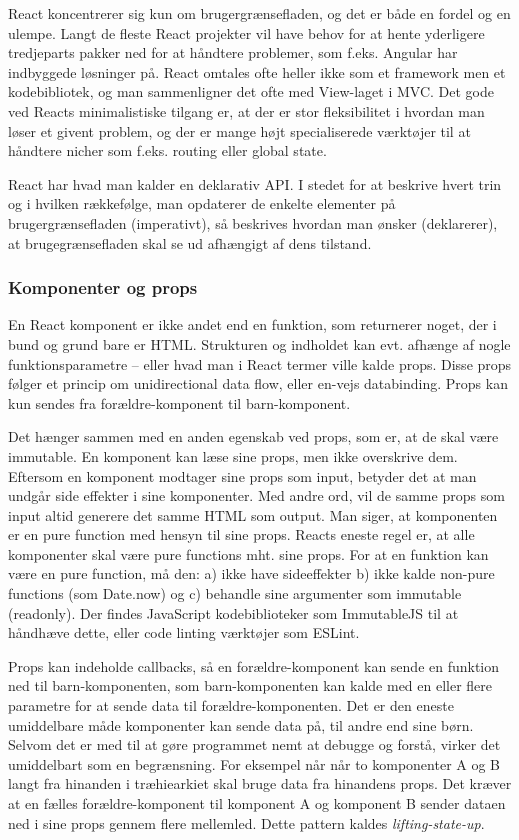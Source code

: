 \documentclass[]{article}
\begin{document}
React koncentrerer sig kun om brugergrænsefladen, og det er både en
fordel og en ulempe. Langt de fleste React projekter vil have behov for
at hente yderligere tredjeparts pakker ned for at håndtere problemer,
som f.eks. Angular har indbyggede løsninger på. React omtales ofte
heller ikke som et framework men et kodebibliotek, og man sammenligner
det ofte med View-laget i MVC. Det gode ved Reacts minimalistiske
tilgang er, at der er stor fleksibilitet i hvordan man løser et givent
problem, og der er mange højt specialiserede værktøjer til at håndtere
nicher som f.eks. routing eller global state.

React har hvad man kalder en deklarativ API. I stedet for at beskrive
hvert trin og i hvilken rækkefølge, man opdaterer de enkelte elementer
på brugergrænsefladen (imperativt), så beskrives hvordan man ønsker
(deklarerer), at brugegrænsefladen skal se ud afhængigt af dens
tilstand.

\hypertarget{komponenter-og-props}{%
\subsubsection{Komponenter og props}\label{komponenter-og-props}}

En React komponent er ikke andet end en funktion, som returnerer noget,
der i bund og grund bare er HTML. Strukturen og indholdet kan evt.
afhænge af nogle funktionsparametre -- eller hvad man i React termer
ville kalde props. Disse props følger et princip om unidirectional data
flow, eller en-vejs databinding. Props kan kun sendes fra
forældre-komponent til barn-komponent.

Det hænger sammen med en anden egenskab ved props, som er, at de skal
være immutable. En komponent kan læse sine props, men ikke overskrive
dem. Eftersom en komponent modtager sine props som input, betyder det at
man undgår side effekter i sine komponenter. Med andre ord, vil de samme
props som input altid generere det samme HTML som output. Man siger, at
komponenten er en pure function med hensyn til sine props. Reacts eneste
regel er, at alle komponenter skal være pure functions mht. sine props.
For at en funktion kan være en pure function, må den: a) ikke have
sideeffekter b) ikke kalde non-pure functions (som Date.now) og c)
behandle sine argumenter som immutable (readonly). Der findes JavaScript
kodebiblioteker som ImmutableJS til at håndhæve dette, eller code
linting værktøjer som ESLint.

Props kan indeholde callbacks, så en forældre-komponent kan sende en
funktion ned til barn-komponenten, som barn-komponenten kan kalde med en
eller flere parametre for at sende data til forældre-komponenten. Det er
den eneste umiddelbare måde komponenter kan sende data på, til andre end
sine børn. Selvom det er med til at gøre programmet nemt at debugge og
forstå, virker det umiddelbart som en begrænsning. For eksempel når når
to komponenter A og B langt fra hinanden i træhiearkiet skal bruge data
fra hinandens props. Det kræver at en fælles forældre-komponent til
komponent A og komponent B sender dataen ned i sine props gennem flere
mellemled. Dette pattern kaldes \emph{lifting-state-up}.
\end{document}
